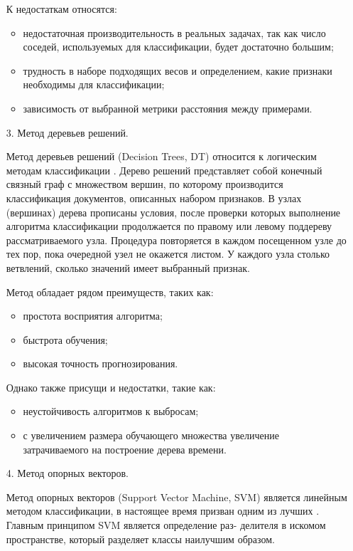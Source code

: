 \begin{enumerate}
К недостаткам относятся: 
\begin{itemize}
\item недостаточная производительность в реальных задачах, так как число соседей, используемых для классификации, будет достаточно большим; 
\item трудность в наборе подходящих весов и определением, какие признаки необходимы для классификации; 
\item зависимость от выбранной метрики расстояния между примерами.
\end{itemize}

\item[3.] Метод деревьев решений.

Метод деревьев решений (Decision Trees, DT) относится к логическим методам классификации \cite{tree}. Дерево решений представляет собой конечный связный граф с множеством вершин, по которому производится классификация документов, описанных набором признаков. В узлах (вершинах) дерева прописаны условия, после проверки которых выполнение алгоритма классификации продолжается по правому или левому поддереву рассматриваемого узла. Процедура повторяется в каждом посещенном узле до тех пор, пока очередной узел не окажется листом. У каждого узла столько ветвлений, сколько значений имеет выбранный признак. 

Метод обладает рядом преимуществ, таких как:
\begin{itemize}
\item простота восприятия алгоритма;
\item быстрота обучения;
\item высокая точность прогнозирования. 
\end{itemize}

Однако также присущи и недостатки, такие как:
\begin{itemize}
\item неустойчивость алгоритмов к выбросам;
\item с увеличением размера обучающего множества увеличение затрачиваемого на построение дерева времени.
\end{itemize}

\item[4.] Метод опорных векторов.

Метод опорных векторов (Support Vector Machine, SVM) является линейным методом классификации, в настоящее время призван одним из лучших \cite{vectors}. Главным принципом SVM является определение раз- делителя в искомом пространстве, который разделяет классы наилучшим образом.


\end{enumerate}
